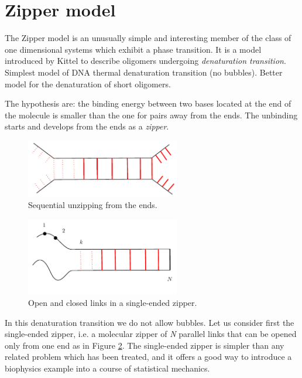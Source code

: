 \documentclass[../main/main.tex]{subfiles}
\begin{document}
\section{Zipper model}

The Zipper model is an unusually simple and interesting member of the class of one dimensional systems which exhibit a phase transition.
It is a model introduced by Kittel \cite{9_lesson_5} to describe oligomers undergoing \emph{denaturation transition}.
 Simplest model of DNA thermal denaturation transition (no bubbles). Better model for the denaturation of short oligomers.
 
The hypothesis are: the binding energy between two bases located at the end of the molecule is smaller than the one for pairs away from the ends. The unbinding starts and develops from the ends as a \emph{zipper}.
\begin{figure}[h!]
\centering
\includegraphics[width=0.6\textwidth]{../lessons/9_image/1.pdf}
\caption{\label{fig:9_1} Sequential unzipping from the ends.}
\end{figure}

\begin{figure}[h!]
\centering
\includegraphics[width=0.6\textwidth]{../lessons/9_image/2.pdf}
\caption{\label{fig:9_2} Open and closed links in a single-ended zipper.}
\end{figure}

In this denaturation transition we do not allow bubbles.
Let us consider first the single-ended zipper, i.e. a molecular zipper of \emph{N} parallel links that can be opened only from one end as in Figure \ref{fig:9_2}. The single-ended zipper is simpler than any related problem which has been treated, and it offers a good way to introduce a biophysics example into a course of statistical mechanics.
\end{document}
